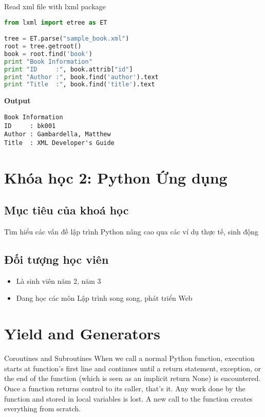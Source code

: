 Read xml file with lxml package

\begin{lstlisting}[language=Python]
from lxml import etree as ET

tree = ET.parse("sample_book.xml")
root = tree.getroot()
book = root.find('book')
print "Book Information"
print "ID     :", book.attrib["id"]
print "Author :", book.find('author').text
print "Title  :", book.find('title').text
\end{lstlisting}

\textbf{Output}

\begin{lstlisting}
Book Information
ID     : bk001
Author : Gambardella, Matthew
Title  : XML Developer's Guide
\end{lstlisting}

\section{Khóa học 2: Python Ứng dụng}

\subsection{Mục tiêu của khoá học}

Tìm hiểu các vấn đề lập trình Python nâng cao qua các ví dụ thực tế, sinh động

\subsection{Đối tượng học viên}

\begin{itemize}
  \item Là sinh viên năm 2, năm 3
  \item Đang học các môn Lập trình song song, phát triển Web
\end{itemize}

\section{Yield and Generators}

Coroutines and Subroutines
When we call a normal Python function, execution starts at function's first line and continues until a return statement, exception, or the end of the function (which is seen as an implicit return None) is encountered. Once a function returns control to its caller, that's it. Any work done by the function and stored in local variables is lost. A new call to the function creates everything from scratch.

